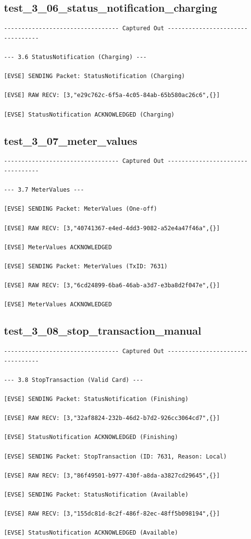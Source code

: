 \documentclass{article}
\begin{document}
\subsection*{test\_3\_06\_status\_notification\_charging}
\begin{lstlisting}
--------------------------------- Captured Out ---------------------------------

--- 3.6 StatusNotification (Charging) ---

[EVSE] SENDING Packet: StatusNotification (Charging)

[EVSE] RAW RECV: [3,"e29c762c-6f5a-4c05-84ab-65b580ac26c6",{}]

[EVSE] StatusNotification ACKNOWLEDGED (Charging)
\end{lstlisting}
\subsection*{test\_3\_07\_meter\_values}
\begin{lstlisting}
--------------------------------- Captured Out ---------------------------------

--- 3.7 MeterValues ---

[EVSE] SENDING Packet: MeterValues (One-off)

[EVSE] RAW RECV: [3,"40741367-e4ed-4dd3-9082-a52e4a47f46a",{}]

[EVSE] MeterValues ACKNOWLEDGED

[EVSE] SENDING Packet: MeterValues (TxID: 7631)

[EVSE] RAW RECV: [3,"6cd24899-6ba6-46ab-a3d7-e3ba8d2f047e",{}]

[EVSE] MeterValues ACKNOWLEDGED
\end{lstlisting}
\subsection*{test\_3\_08\_stop\_transaction\_manual}
\begin{lstlisting}
--------------------------------- Captured Out ---------------------------------

--- 3.8 StopTransaction (Valid Card) ---

[EVSE] SENDING Packet: StatusNotification (Finishing)

[EVSE] RAW RECV: [3,"32af8824-232b-46d2-b7d2-926cc3064cd7",{}]

[EVSE] StatusNotification ACKNOWLEDGED (Finishing)

[EVSE] SENDING Packet: StopTransaction (ID: 7631, Reason: Local)

[EVSE] RAW RECV: [3,"86f49501-b977-430f-a8da-a3827cd29645",{}]

[EVSE] SENDING Packet: StatusNotification (Available)

[EVSE] RAW RECV: [3,"155dc81d-8c2f-486f-82ec-48ff5b098194",{}]

[EVSE] StatusNotification ACKNOWLEDGED (Available)
\end{lstlisting}
\end{document}
